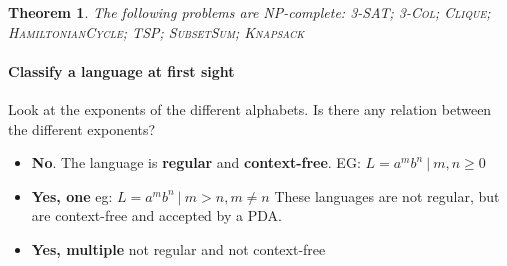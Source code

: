 \documentclass[a3paper, 8pt]{extarticle}
\newtheorem{theorem}{Theorem}[section]
\newtheorem*{definition}{Definition}
\begin{document}
\begin{multicols*}{6}




\begin{theorem}
    The following problems are NP-complete: \textsc{3-SAT; 3-Col; Clique; HamiltonianCycle; TSP; SubsetSum; Knapsack}
\end{theorem}


\paragraph{Classify a language at first sight}
Look at the exponents of the different alphabets. Is there any relation between the different exponents?
\begin{itemize}
    \item \textbf{No}. The language is \textbf{regular} and \textbf{context-free}. EG: $L=a^mb^n \ | \ m,n\geq 0$
    \item \textbf{Yes, one} eg: $L=a^mb^n \ | \ m > n, m \neq n $ These languages are not regular, but are context-free and accepted by a PDA.
    \item \textbf{Yes, multiple} not regular and not context-free
\end{itemize} 
\end{multicols*}
\end{document}
